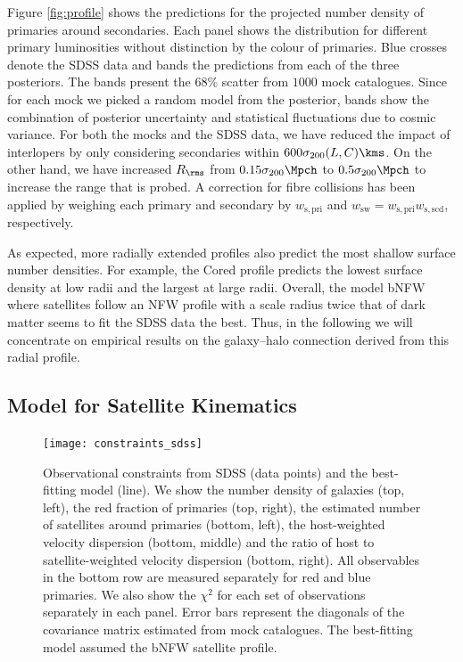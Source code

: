 \documentclass[fleqn,usenatbib,useAMS]{mnras}
\begin{document}
Figure \ref{fig:profile} shows the predictions for the projected number density of primaries around secondaries. Each panel shows the distribution for different primary luminosities without distinction by the colour of primaries. Blue crosses denote the SDSS data and bands the predictions from each of the three posteriors. The bands present the $68\%$ scatter from $1000$ mock catalogues. Since for each mock we picked a random model from the posterior, bands show the combination of posterior uncertainty and statistical fluctuations due to cosmic variance. For both the mocks and the SDSS data, we have reduced the impact of interlopers by only considering secondaries within $600 \sigma_{200}(L, C) \kms$. On the other hand, we have increased $R_\rms$ from $0.15 \sigma_{200} \Mpch$ to $0.5 \sigma_{200} \Mpch$ to increase the range that is probed. A correction for fibre collisions has been applied by weighing each primary and secondary by $w_{\mathrm{s, pri}}$ and $w_{\mathrm{sw}} = w_{\mathrm{s, pri}} w_{\mathrm{s, scd}}$, respectively.

As expected, more radially extended profiles also predict the most shallow surface number densities. For example, the Cored profile predicts the lowest surface density at low radii and the largest at large radii. Overall, the model bNFW where satellites follow an NFW profile with a scale radius twice that of dark matter seems to fit the SDSS data the best. Thus, in the following we will concentrate on empirical results on the galaxy--halo connection derived from this radial profile.

\subsection{Model for Satellite Kinematics}

\begin{figure}
	\centering
	\texttt{[image: constraints\_sdss]}
	\caption{Observational constraints from SDSS (data points) and the best-fitting model (line). We show the number density of galaxies (top, left), the red fraction of primaries (top, right), the estimated number of satellites around primaries (bottom, left), the host-weighted velocity dispersion (bottom, middle) and the ratio of host to satellite-weighted velocity dispersion (bottom, right). All observables in the bottom row are measured separately for red and blue primaries. We also show the $\chi^2$ for each set of observations separately in each panel. Error bars represent the diagonals of the covariance matrix estimated from mock catalogues. The best-fitting model assumed the bNFW satellite profile.}
	\label{fig:constraints}
\end{figure}
\end{document}
